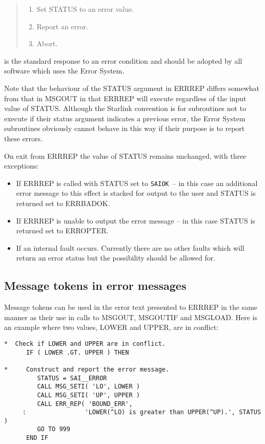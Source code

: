\documentclass[twoside,11pt]{article}
\newcommand{\xlabel}[1]{}
\renewcommand{\_}{\texttt{\symbol{95}}}
\newcommand{\const}[1]{\texttt{#1}}
\newcommand{\saiok}{\const{SAI\_\_OK}}
\begin{document}
\begin {quote}
\begin {enumerate}
\item Set STATUS to an error value.
\item Report an error.
\item Abort.
\end {enumerate}
\end {quote}

is the standard response to an error condition and should be adopted by all
software which uses the Error System. 

Note that the behaviour of the STATUS argument in ERR\_REP differs somewhat 
from that in MSG\_OUT in that ERR\_REP will execute regardless of the input 
value of STATUS.
Although the Starlink convention is for subroutines not to execute if their
status argument indicates a previous error, the Error System subroutines
obviously cannot behave in this way if their purpose is to report these 
errors.

On exit from ERR\_REP the value of STATUS remains unchanged, with three
exceptions:

\begin{itemize}
\item If ERR\_REP is called with STATUS set to \saiok\ -- in this case an
additional error message 
to this effect is stacked for output to the user and STATUS is returned set
to ERR\_\_BADOK.
\item If ERR\_REP is unable to output the error message -- in this case
STATUS is returned set to ERR\_\_OPTER.
\item If an internal fault occurs. Currently there are no other faults
which will return an error status but the possibility should be allowed for.
\end{itemize}


\subsection{\xlabel{message_tokens_in_error_messages}Message tokens in error messages \label{etok_sect}}

Message tokens can be used in the error text presented to ERR\_REP
in the same manner as their use in calls to MSG\_OUT, MSG\_OUTIF and 
MSG\_LOAD.
Here is an example where two values, LOWER and UPPER, are in conflict: 

\begin {small}
\begin{verbatim}
*  Check if LOWER and UPPER are in conflict.
      IF ( LOWER .GT. UPPER ) THEN

*     Construct and report the error message.
         STATUS = SAI__ERROR
         CALL MSG_SETI( 'LO', LOWER )
         CALL MSG_SETI( 'UP', UPPER )
         CALL ERR_REP( 'BOUND_ERR', 
     :                'LOWER(^LO) is greater than UPPER(^UP).', STATUS )
         GO TO 999
      END IF
\end{verbatim}
\end {small}
\end{document}
